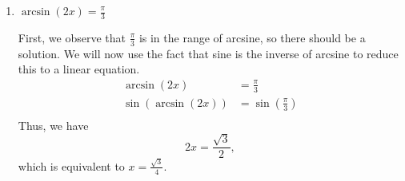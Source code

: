 \documentclass{ximera}
\begin{document}
\begin{example}
\begin{enumerate}
\begin{explanation}
{\bf Hold those horses! }

Remember, we had to restrict the domain of sine in order to define an inverse function, which we called arcsine. Arcsine is the inverse of the {\it restricted} sine function, whose domain is $\Big[\!-\frac{\pi}{2},\frac{\pi}{2}\Big]$. $\frac{5\pi}{4}$ is larger than $\frac{\pi}{2}$, so it is not within the domain of this restricted sine function. 

Thus, we begin by simplifying $\sin\!\Big(\frac{5\pi}{4}\Big) = -\frac{\sqrt{2}}{2}$. 

Now, let's consider $\arcsin\!\Big(\!\!-\!\frac{\sqrt{2}}{2}\Big)$, recalling again the {\it range} of arcsine. We are looking for the value of $y$ in $\Big[\!-\frac{\pi}{2},\frac{\pi}{2}\Big]$ such that $\sin(y) =-\frac{\sqrt{2}}{2}$.

Hence, $y$ is $-\frac{\pi}{4}$, and we now see that 
\begin{equation*}
\arcsin\!\Big(\sin\!\Big(\frac{5\pi}{4}\Big)\Big) = \arcsin\!\Big(\!\!-\!\frac{\sqrt{2}}{2}\Big) = -\frac{\pi}{4}.
\end{equation*}


\end{explanation}


\item $\arcsin(2x) = \frac{\pi}{3}$\\
\begin{explanation}
First, we observe that $\frac{\pi}{3}$ is in the range of arcsine, so there should be a solution. We will now use the fact that sine is the inverse of arcsine to reduce this to a linear equation.
\begin{align*}
\arcsin(2x) &= \frac{\pi}{3}\\
\sin(\arcsin(2x)) &= \sin\left(\frac{\pi}{3}\right) \\
\end{align*}
Thus, we have
$$2x = \frac{\sqrt{3}}{2},$$
which is equivalent to $x = \frac{\sqrt{3}}{4}$.

\end{explanation}
\end{enumerate}
\end{example}
\end{document}
